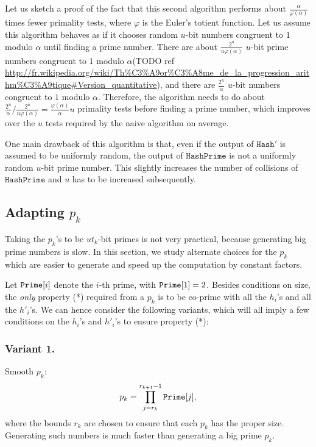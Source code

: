 \documentclass{llncs}
\newcommand{\Hash}{\ensuremath{\mathtt{Hash}}}
\newcommand{\HashPrime}{\ensuremath{\mathtt{HashPrime}}}
\begin{document}
Let us sketch a proof of the fact that this second algorithm performs about $\frac{\alpha}{\varphi(\alpha)}$ times fewer primality tests, where $\varphi$ is the Euler's totient function.
Let us assume this algorithm behaves as if it chooses random $u$-bit numbers congruent to $1$ modulo $\alpha$ until finding a prime number.
There are about $\frac{2^u}{u \varphi(\alpha)}$ $u$-bit prime numbers congruent to $1$ modulo $\alpha$(TODO ref \url{http://fr.wikipedia.org/wiki/Th%C3%A9or%C3%A8me_de_la_progression_arithm%C3%A9tique#Version_quantitative}), and there are $\frac{2^u}{\alpha}$ $u$-bit numbers congruent to $1$ modulo $\alpha$.
Therefore, the algorithm needs to do about $\frac{2^u}{\alpha} / \frac{2^u}{u \varphi(\alpha)} = \frac{\varphi(\alpha)}{\alpha} u$ primality tests before finding a prime number, which improves over the $u$ tests required by the naive algorithm on average.

One main drawback of this algorithm is that, even if the output of $\Hash'$ is assumed to be uniformly random, the output of $\HashPrime$ is not a uniformly random $u$-bit prime number.
This slightly increases the number of collisions of $\HashPrime$ and $u$ has to be increased subsequently.


\subsection{Adapting $p_k$}
\label{sec:choicep}

Taking the $p_k$'s to be $ut_k$-bit primes is not very practical, because generating big prime numbers is slow. In this section, we study alternate choices for the $p_k$ which are easier to generate and speed up the computation by constant factors.

Let $\mbox{{\tt Prime}}[i]$ denote the $i$-th prime, with $\mbox{{\tt Prime}}[1]=2$. Besides conditions on size, the \textit{only} property (*) required from a $p_k$ is to be co-prime with all the $h_i$'s and all the $h'_i$'s. We can hence consider the following variants, which will all imply a few conditions on the $h_i$'s and $h'_i$'s to ensure property (*):
\subsubsection{Variant 1.} Smooth $p_k$:
\[ p_k=\prod_{j=r_k}^{r_{k+1}-1} \mbox{{\tt Prime}}[j], \]
where the bounds $r_k$ are chosen to ensure that each $p_k$ has the proper size.
Generating such numbers is much faster than generating a big prime $p_k$.
\end{document}
